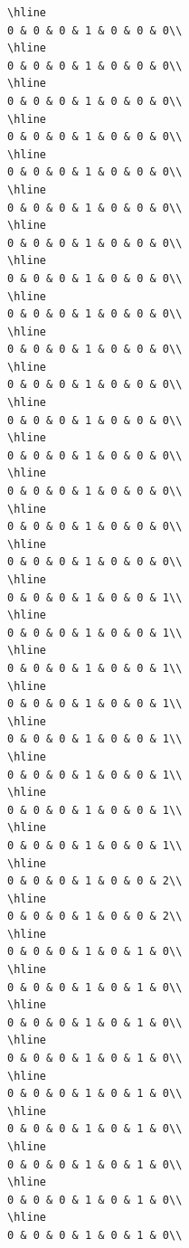 \documentclass[
]{article}
\begin{document}
\begin{verbatim}
\hline
0 & 0 & 0 & 1 & 0 & 0 & 0\\
\hline
0 & 0 & 0 & 1 & 0 & 0 & 0\\
\hline
0 & 0 & 0 & 1 & 0 & 0 & 0\\
\hline
0 & 0 & 0 & 1 & 0 & 0 & 0\\
\hline
0 & 0 & 0 & 1 & 0 & 0 & 0\\
\hline
0 & 0 & 0 & 1 & 0 & 0 & 0\\
\hline
0 & 0 & 0 & 1 & 0 & 0 & 0\\
\hline
0 & 0 & 0 & 1 & 0 & 0 & 0\\
\hline
0 & 0 & 0 & 1 & 0 & 0 & 0\\
\hline
0 & 0 & 0 & 1 & 0 & 0 & 0\\
\hline
0 & 0 & 0 & 1 & 0 & 0 & 0\\
\hline
0 & 0 & 0 & 1 & 0 & 0 & 0\\
\hline
0 & 0 & 0 & 1 & 0 & 0 & 0\\
\hline
0 & 0 & 0 & 1 & 0 & 0 & 0\\
\hline
0 & 0 & 0 & 1 & 0 & 0 & 0\\
\hline
0 & 0 & 0 & 1 & 0 & 0 & 0\\
\hline
0 & 0 & 0 & 1 & 0 & 0 & 1\\
\hline
0 & 0 & 0 & 1 & 0 & 0 & 1\\
\hline
0 & 0 & 0 & 1 & 0 & 0 & 1\\
\hline
0 & 0 & 0 & 1 & 0 & 0 & 1\\
\hline
0 & 0 & 0 & 1 & 0 & 0 & 1\\
\hline
0 & 0 & 0 & 1 & 0 & 0 & 1\\
\hline
0 & 0 & 0 & 1 & 0 & 0 & 1\\
\hline
0 & 0 & 0 & 1 & 0 & 0 & 1\\
\hline
0 & 0 & 0 & 1 & 0 & 0 & 2\\
\hline
0 & 0 & 0 & 1 & 0 & 0 & 2\\
\hline
0 & 0 & 0 & 1 & 0 & 1 & 0\\
\hline
0 & 0 & 0 & 1 & 0 & 1 & 0\\
\hline
0 & 0 & 0 & 1 & 0 & 1 & 0\\
\hline
0 & 0 & 0 & 1 & 0 & 1 & 0\\
\hline
0 & 0 & 0 & 1 & 0 & 1 & 0\\
\hline
0 & 0 & 0 & 1 & 0 & 1 & 0\\
\hline
0 & 0 & 0 & 1 & 0 & 1 & 0\\
\hline
0 & 0 & 0 & 1 & 0 & 1 & 0\\
\hline
0 & 0 & 0 & 1 & 0 & 1 & 0\\

\end{verbatim}
\end{document}
